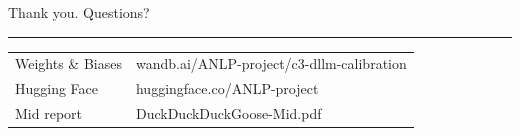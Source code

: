 \documentclass[aspectratio=169,10pt,t]{beamer}
\begin{document}
\begin{frame}[c,plain]
  \hspace*{4mm}\begin{minipage}{0.86\linewidth}\raggedright
    {\fontsize{24}{28}\selectfont\firasemibold Thank you. Questions?}\par
    \vspace{3mm}
    {\color{accent}\rule{14mm}{1.6pt}}\par
    \vspace{4mm}
    \small\color{ink2}
    \begin{tabular}{@{}ll@{}}
      Weights \& Biases & wandb.ai/ANLP-project/c3-dllm-calibration \\
      Hugging Face      & huggingface.co/ANLP-project \\
      Mid report        & DuckDuckDuckGoose-Mid.pdf \\
    \end{tabular}
  \end{minipage}
\end{frame}

\appendix
\end{document}

